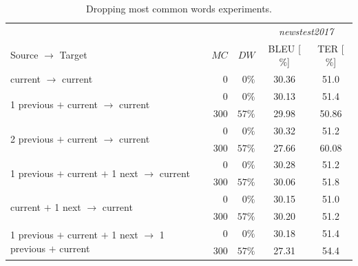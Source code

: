 \documentclass[11pt, a4paper, landscape]{article}
\begin{document}
\NewPage
\vfill
\begin{table}
	\small
	\bf
	\caption{Dropping most common words experiments.}
	\begin{center}
		\begin{tabular}{l|rr||cc}
			&& & \multicolumn{2}{c}{\textit{newstest2017}} \\
			\phantom{1 previous $+$ }Source\phantom{ $+$ 1 next} $\to$ Target & $MC$ & $DW$ & BLEU [$\%$] & TER [$\%$] \\
			\toprule
			\toprule
			\phantom{1 previous $+$ }current\phantom{ $+$ 1 next} $\to$ \phantom{1 previous $+$ }current & 0 & $0\%$ & 30.36 & 51.0 \\
			\midrule
			\multirow{2}{*}{1 previous $+$ current\phantom{ $+$ 1 next} $\to$ \phantom{1 previous $+$ }current} &0 & $0\%$ & \alert{30.13} & 51.4 \\
			& 300 & $57\%$ & 29.98 & \alert{50.86} \\
			\midrule
			\multirow{2}{*}{2 previous $+$ current\phantom{ $+$ 1 next} $\to$ \phantom{1 previous $+$ }current} & 0 & $0\%$ & \alert{30.32} & \alert{51.2} \\
			& 300 & $57\%$ & 27.66 & 60.08 \\
			\midrule
			\multirow{2}{*}{1 previous $+$ current $+$ 1 next $\to$ \phantom{1 previous $+$ }current} & 0 & $0\%$ & \alert{30.28} & \alert{51.2} \\
			& 300 & $57\%$ & 30.06 & 51.8 \\
			\midrule
			\multirow{2}{*}{\phantom{ $+$ 1 previous}current $+$ 1 next $\to$ \phantom{1 previous $+$ }current} & 0 & $0\%$ & 30.15 & \alert{51.0} \\
			&300 & $57\%$& \alert{30.20} & 51.2 \\
      \midrule
      \midrule
      \multirow{2}{*}{1 previous $+$ current $+$ 1 next $\to$ 1 previous $+$ current} & 0 & $0\%$ & \alert{30.18} & \alert{51.4} \\
      & 300 & $57\%$ & 27.31 & 54.4  \\
		\end{tabular}
	\end{center}
\end{table}
\vfill
\end{document}

